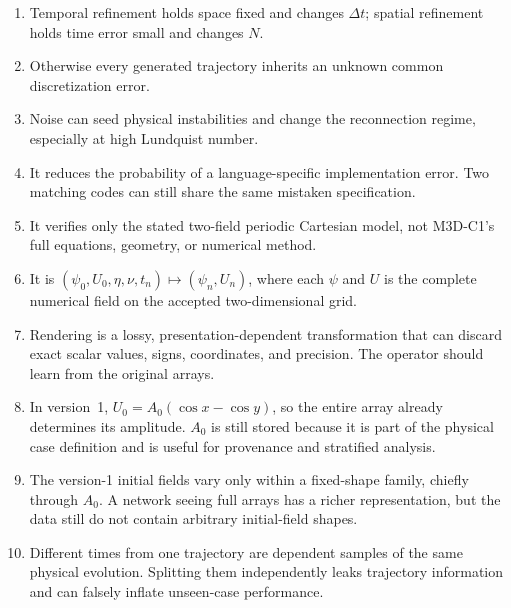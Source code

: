 \documentclass[11pt]{article}
\begin{document}
\begin{enumerate}[label=\textbf{A\arabic*.}]
  \item Temporal refinement holds space fixed and changes $\Delta t$; spatial refinement holds time error small and changes $N$.
  \item Otherwise every generated trajectory inherits an unknown common discretization error.
  \item Noise can seed physical instabilities and change the reconnection regime, especially at high Lundquist number.
  \item It reduces the probability of a language-specific implementation error. Two matching codes can still share the same mistaken specification.
  \item It verifies only the stated two-field periodic Cartesian model, not M3D-C1's full equations, geometry, or numerical method.
  \item It is $(\psi_0,U_0,\eta,\nu,t_n)\mapsto(\psi_n,U_n)$, where each $\psi$ and $U$ is the complete numerical field on the accepted two-dimensional grid.
  \item Rendering is a lossy, presentation-dependent transformation that can discard exact scalar values, signs, coordinates, and precision. The operator should learn from the original arrays.
  \item In version~1, $U_0=A_0(\cos x-\cos y)$, so the entire array already determines its amplitude. $A_0$ is still stored because it is part of the physical case definition and is useful for provenance and stratified analysis.
  \item The version-1 initial fields vary only within a fixed-shape family, chiefly through $A_0$. A network seeing full arrays has a richer representation, but the data still do not contain arbitrary initial-field shapes.
  \item Different times from one trajectory are dependent samples of the same physical evolution. Splitting them independently leaks trajectory information and can falsely inflate unseen-case performance.
\end{enumerate}
\end{document}
